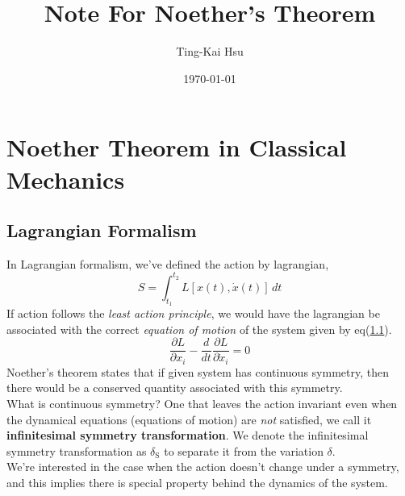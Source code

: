 \documentclass[12pt]{article}
\title{Note For Noether's Theorem}
\author{Ting-Kai Hsu}
\date{\today}
\numberwithin{equation}{section}
\begin{document}
\maketitle
\tableofcontents
\section{Noether Theorem in Classical Mechanics}
\subsection{Lagrangian Formalism}
In Lagrangian formalism, we've defined the action by lagrangian,
\begin{equation}
    S = \int_{t_1}^{t_2}{L\left[x(t), \dot{x}(t)\right]\,dt}
\end{equation}\label{1.1}
\indent If action follows the \textit{least action principle}, we would have the lagrangian be associated with the correct \textit{equation of motion} of the system given by eq(\hyperref[1.1]{1.1}).
\begin{equation}
    \frac{\partial L}{\partial x_i} - \frac{d}{dt}\frac{\partial L}{\partial \dot{x}_i} = 0
\end{equation}\label{1.2}
\indent Noether's theorem states that if given system has continuous symmetry, then there would be a conserved quantity associated with this symmetry.
\\\indent What is continuous symmetry? 
One that leaves the action invariant even when the dynamical equations (equations of motion) are \textit{not} satisfied, we call it \textbf{infinitesimal symmetry transformation}. 
We denote the infinitesimal symmetry transformation as $\delta_{\text{S}}$ to separate it from the variation $\delta$.
\\\indent We're interested in the case when the action doesn't change under a symmetry, and this implies there is special property behind the dynamics of the system.
\end{document}
